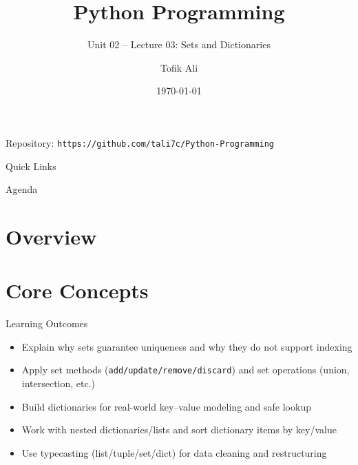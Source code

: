 \documentclass{beamer}
\title[Python Programming]{Python Programming}
\subtitle{Unit 02 -- Lecture 03: Sets and Dictionaries}
\author{Tofik Ali}
\institute{School of Computer Science, UPES Dehradun}
\date{\today}
\begin{document}
\begin{frame}[fragile]
  \titlepage
  \vspace{0.5em}
  \begin{center}
  \footnotesize Repository: \texttt{https://github.com/tali7c/Python-Programming}
  \end{center}
\end{frame}

\begin{frame}[fragile]{Quick Links}
  \centering
  \hyperlink{sec:core}{}\hspace{1em}
  \hyperlink{sec:demo}{}\hspace{1em}
  \hyperlink{sec:interactive}{}\hspace{1em}
  \hyperlink{sec:summary}{}
\end{frame}

\begin{frame}[fragile]{Agenda}
  \tableofcontents
\end{frame}

\section{Overview}

\section{Core Concepts}
\label{sec:core}

\begin{frame}[fragile]{Learning Outcomes}
  \begin{itemize}[<+->]
    \item Explain why sets guarantee uniqueness and why they do not support indexing
    \item Apply set methods (\texttt{add/update/remove/discard}) and set operations (union, intersection, etc.)
    \item Build dictionaries for real-world key--value modeling and safe lookup
    \item Work with nested dictionaries/lists and sort dictionary items by key/value
    \item Use typecasting (list/tuple/set/dict) for data cleaning and restructuring
  \end{itemize}
\end{frame}

\end{document}

